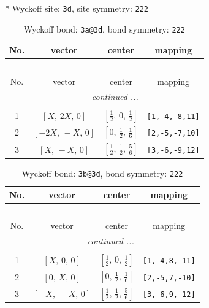 \documentclass[fleqn,8pt]{jsarticle}
\begin{document}
* Wyckoff site: {\tt 3d}, site symmetry: {\tt 222}
\renewcommand{\arraystretch}{1.2}
\begin{longtable}{cccc}
\caption{Wyckoff bond: {\tt 3a@3d}, bond symmetry: {\tt 222}}
 \\
 \hline \hline
No. & vector & center & mapping \\ \hline \endfirsthead

\multicolumn{3}{l}{\tablename\ \thetable{}} \\
 \hline \hline
No. & vector & center & mapping \\ \hline \endhead

 \hline \hline
\multicolumn{3}{r}{\footnotesize\it continued ...} \\ \endfoot

 \hline \hline
\multicolumn{3}{r}{} \\ \endlastfoot

1 & $\left[ X,\, 2 X,\, 0 \right]$ & $\left[ \frac{1}{2},\, 0,\, \frac{1}{2} \right]$ & {\tt [1,-4,-8,11]} \\ \hline
2 & $\left[ - 2 X,\, - X,\, 0 \right]$ & $\left[ 0,\, \frac{1}{2},\, \frac{1}{6} \right]$ & {\tt [2,-5,-7,10]} \\ \hline
3 & $\left[ X,\, - X,\, 0 \right]$ & $\left[ \frac{1}{2},\, \frac{1}{2},\, \frac{5}{6} \right]$ & {\tt [3,-6,-9,12]} \\
\end{longtable}
\renewcommand{\arraystretch}{1.2}
\begin{longtable}{cccc}
\caption{Wyckoff bond: {\tt 3b@3d}, bond symmetry: {\tt 222}}
 \\
 \hline \hline
No. & vector & center & mapping \\ \hline \endfirsthead

\multicolumn{3}{l}{\tablename\ \thetable{}} \\
 \hline \hline
No. & vector & center & mapping \\ \hline \endhead

 \hline \hline
\multicolumn{3}{r}{\footnotesize\it continued ...} \\ \endfoot

 \hline \hline
\multicolumn{3}{r}{} \\ \endlastfoot

1 & $\left[ X,\, 0,\, 0 \right]$ & $\left[ \frac{1}{2},\, 0,\, \frac{1}{2} \right]$ & {\tt [1,-4,8,-11]} \\ \hline
2 & $\left[ 0,\, X,\, 0 \right]$ & $\left[ 0,\, \frac{1}{2},\, \frac{1}{6} \right]$ & {\tt [2,-5,7,-10]} \\ \hline
3 & $\left[ - X,\, - X,\, 0 \right]$ & $\left[ \frac{1}{2},\, \frac{1}{2},\, \frac{5}{6} \right]$ & {\tt [3,-6,9,-12]} \\
\end{longtable}
\end{document}
